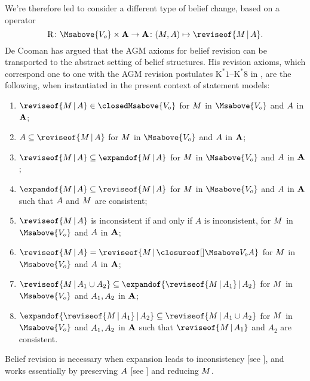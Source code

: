 \documentclass[preprint]{isipta2025}
\begin{document}
We're therefore led to consider a different type of belief change, based on a  operator
\begin{equation*}
\revise
\colon\Msabove{\zeroM}\times\As\to\As
\colon(\M,\A)\mapsto\reviseof{\M\given\A}.
\end{equation*}
De Cooman \cite{cooman2003a} has argued that the AGM axioms for belief revision \cite{alchourron1985,gardenfors1988} can be transported to the abstract setting of belief structures.
His revision axioms, which correspond one to one with the AGM revision postulates \(\mathrm{K}^*1\)--\(\mathrm{K}^*8\) in \cite{gardenfors1988}, are the following, when instantiated in the present context of statement models:
\begin{enumerate}[label={\upshape BR\arabic*.},ref={\upshape BR\arabic*},series=BR,widest=8,leftmargin=*,itemsep=0pt]
\item\label{axiom:revision:1} \(\reviseof{\M\given\A}\in\closedMsabove{\zeroM}\) for \(M\) in \(\Msabove{\zeroM}\) and \(A\) in \(\mathbf{A}\);
\item\label{axiom:revision:2} \(\A\subseteq\reviseof{\M\given\A}\) for \(M\) in \(\Msabove{\zeroM}\) and \(A\) in \(\mathbf{A}\);
\item\label{axiom:revision:3} \(\reviseof{\M\given\A}\subseteq\expandof{\M\given\A}\) for \(M\) in \(\Msabove{\zeroM}\) and \(A\) in \(\mathbf{A}\);
\item\label{axiom:revision:4}\(\expandof{\M\given\A}\subseteq\reviseof{\M\given\A}\) for  \(M\) in \(\Msabove{\zeroM}\) and \(A\) in \(\mathbf{A}\) such that \(A\) and \(M\) are consistent;
\item\label{axiom:revision:5} \(\reviseof{\M\given\A}\) is inconsistent if and only if \(A\) is inconsistent, for \(M\) in \(\Msabove{\zeroM}\) and \(A\) in \(\mathbf{A}\);
\item\label{axiom:revision:6} \(\reviseof{\M\given\A}=\reviseof{\M\given\Mclsbgof{\zeroM}{\A}}\) for \(M\) in \(\Msabove{\zeroM}\) and \(A\) in \(\mathbf{A}\);
\item\label{axiom:revision:7} \(\reviseof{\M\given\A_1\union\A_2}\subseteq\expandof{\reviseof{\M\given\A_1}\given\A_2}\) for \(M\) in \(\Msabove{\zeroM}\) and \(A_1,A_2\) in \(\mathbf{A}\);
\item\label{axiom:revision:8} \(\expandof{\reviseof{\M\given\A_1}\given\A_2}\subseteq\reviseof{\M\given\A_1\union\A_2}\) for \(M\) in \(\Msabove{\zeroM}\) and \(A_1,A_2\) in \(\mathbf{A}\) such that \(\reviseof{\M\given\A_1}\) and \(A_2\) are consistent.
\end{enumerate}
Belief revision is necessary when expansion leads to inconsistency [see ], and works essentially by preserving \(A\) [see ] and reducing \(M\).
\end{document}
